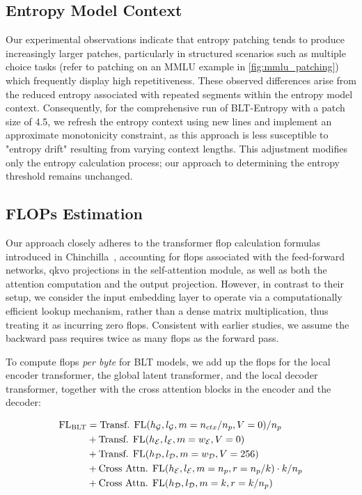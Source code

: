 \subsection{Entropy Model Context}
\label{section:entropy-context}
Our experimental observations indicate that entropy patching tends to produce increasingly larger patches, particularly in structured scenarios such as multiple choice tasks (refer to patching on an MMLU example in \autoref{fig:mmlu_patching}) which frequently display high repetitiveness. These observed differences arise from the reduced entropy associated with repeated segments within the entropy model context. Consequently, for the comprehensive run of {\textsc BLT}-Entropy with a patch size of 4.5, we refresh the entropy context using new lines and implement an approximate monotonicity constraint, as this approach is less susceptible to "entropy drift" resulting from varying context lengths. This adjustment modifies only the entropy calculation process; our approach to determining the entropy threshold remains unchanged.

\subsection{FLOPs Estimation} 
\label{section:flops}

Our approach closely adheres to the transformer flop calculation formulas introduced in Chinchilla~\citep{hoffmann2022training}, accounting for flops associated with the feed-forward networks, qkvo projections in the self-attention module, as well as both the attention computation and the output projection. However, in contrast to their setup, we consider the input embedding layer to operate via a computationally efficient lookup mechanism, rather than a dense matrix multiplication, thus treating it as incurring zero flops. Consistent with earlier studies, we assume the backward pass requires twice as many flops as the forward pass.

To compute flops \textit{per byte} for {\textsc BLT} models, we add up the flops for the local encoder transformer, the global latent transformer, and the local decoder transformer, together with the cross attention blocks in the encoder and the decoder:

\begin{align}
    \text{FL}_{\text{{\textsc BLT}}} &= \text{Transf. FL}(h_{\mathcal{G}}, l_{\mathcal{G}}, m=n_{ctx}/n_p,V=0) / n_p\\
   &+ \text{Transf. FL}(h_{\mathcal{E}}, l_{\mathcal{E}}, m=w_{\mathcal{E}}, V=0) \\
   &+ \text{Transf. FL}(h_{\mathcal{D}}, l_{\mathcal{D}}, m=w_{\mathcal{D}}, V=256) \\ 
    &+ \text{Cross Attn. FL}(h_{\mathcal{E}}, l_{\mathcal{E}}, m=n_p, r=n_p/k) \cdot k/n_p \\ 
   &+ \text{Cross Attn. FL}(h_{\mathcal{D}}, l_{\mathcal{D}}, m=k, r=k/n_p) 
\end{align}

